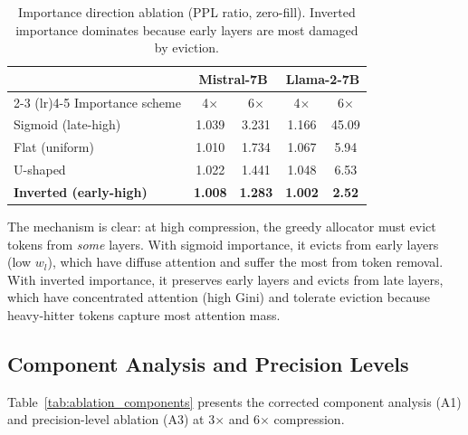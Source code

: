 \documentclass{article}
\begin{document}
\begin{table}[t]
\centering
\caption{Importance direction ablation (PPL ratio, zero-fill).
Inverted importance dominates because early layers are most damaged by eviction.}
\label{tab:importance_direction}
\small
\setlength{\tabcolsep}{3pt}
\begin{tabular}{@{}lcccc@{}}
\toprule
& \multicolumn{2}{c}{Mistral-7B} & \multicolumn{2}{c}{Llama-2-7B} \\
\cmidrule(lr){2-3} \cmidrule(lr){4-5}
Importance scheme & 4$\times$ & 6$\times$ & 4$\times$ & 6$\times$ \\
\midrule
Sigmoid (late-high) & 1.039 & 3.231 & 1.166 & 45.09 \\
Flat (uniform)      & 1.010 & 1.734 & 1.067 & 5.94 \\
U-shaped            & 1.022 & 1.441 & 1.048 & 6.53 \\
\textbf{Inverted (early-high)} & \textbf{1.008} & \textbf{1.283} & \textbf{1.002} & \textbf{2.52} \\
\bottomrule
\end{tabular}
\vspace{-0.05in}
\end{table}

The mechanism is clear: at high compression, the greedy allocator must evict tokens from \emph{some} layers.
With sigmoid importance, it evicts from early layers (low $w_l$), which have diffuse attention and suffer the most from token removal.
With inverted importance, it preserves early layers and evicts from late layers, which have concentrated attention (high Gini) and tolerate eviction because heavy-hitter tokens capture most attention mass.

\subsection{Component Analysis and Precision Levels}

Table~\ref{tab:ablation_components} presents the corrected component analysis (A1) and precision-level ablation (A3) at 3$\times$ and 6$\times$ compression.
\end{document}
